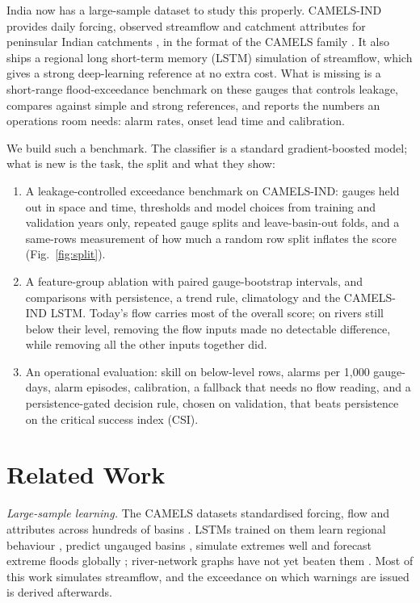 \documentclass[conference]{IEEEtran}
\begin{document}
India now has a large-sample dataset to study this properly. CAMELS-IND provides daily forcing, observed streamflow and catchment attributes for peninsular Indian catchments \cite{Mangukiya2025}, in the format of the CAMELS family \cite{Newman2015,Addor2017}. It also ships a regional long short-term memory (LSTM) simulation of streamflow, which gives a strong deep-learning reference at no extra cost. What is missing is a short-range flood-exceedance benchmark on these gauges that controls leakage, compares against simple and strong references, and reports the numbers an operations room needs: alarm rates, onset lead time and calibration.

We build such a benchmark. The classifier is a standard gradient-boosted model; what is new is the task, the split and what they show:
\begin{enumerate}
\item A leakage-controlled exceedance benchmark on CAMELS-IND: gauges held out in space and time, thresholds and model choices from training and validation years only, repeated gauge splits and leave-basin-out folds, and a same-rows measurement of how much a random row split inflates the score (Fig.~\ref{fig:split}).
\item A feature-group ablation with paired gauge-bootstrap intervals, and comparisons with persistence, a trend rule, climatology and the CAMELS-IND LSTM. Today's flow carries most of the overall score; on rivers still below their level, removing the flow inputs made no detectable difference, while removing all the other inputs together did.
\item An operational evaluation: skill on below-level rows, alarms per 1,000 gauge-days, alarm episodes, calibration, a fallback that needs no flow reading, and a persistence-gated decision rule, chosen on validation, that beats persistence on the critical success index (CSI).
\end{enumerate}

\section{Related Work}
\textit{Large-sample learning.} The CAMELS datasets standardised forcing, flow and attributes across hundreds of basins \cite{Newman2015,Addor2017}. LSTMs trained on them learn regional behaviour \cite{Kratzert2019a}, predict ungauged basins \cite{Kratzert2019b}, simulate extremes well \cite{Frame2022} and forecast extreme floods globally \cite{Nearing2024}; river-network graphs have not yet beaten them \cite{Kirschstein2024}. Most of this work simulates streamflow, and the exceedance on which warnings are issued is derived afterwards.
\end{document}
